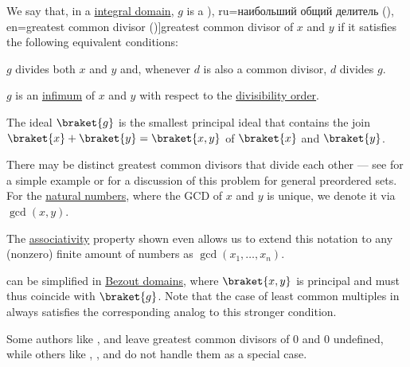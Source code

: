 \begin{definition}\label{def:gcd}
  We say that, in a \hyperref[def:integral_domain]{integral domain}, \( g \) is a \term[bg=най-голям общ делител (на два полинома) (\cite[173]{Обрешков1962ВисшаАлгебра}), ru=наибольший общий делитель (\cite[def. 3.5.3]{Винберг2014КурсАлгебры}), en=greatest common divisor (\cite[def. V.2.2]{Aluffi2009Algebra})]{greatest common divisor} of \( x \) and \( y \) if it satisfies the following equivalent conditions:

  \begin{thmenum}
     \( g \) divides both \( x \) and \( y \) and, whenever \( d \) is also a common divisor, \( d \) divides \( g \).

     \( g \) is an \hyperref[def:extremal_points/supremum_and_infimum]{infimum} of \( x \) and \( y \) with respect to the \hyperref[thm:semiring_divisibility_order]{divisibility order}.

     The ideal \( \braket{ g } \) is the smallest principal ideal that contains the join \( \braket{ x } + \braket{ y } = \braket{ x, y } \) of \( \braket{ x } \) and \( \braket{ y } \).
  \end{thmenum}
\end{definition}
\begin{comments}
  \item There may be distinct greatest common divisors that divide each other --- see  for a simple example or  for a discussion of this problem for general preordered sets. For the \hyperref[def:natural_numbers]{natural numbers}, where the GCD of \( x \) and \( y \) is unique, we denote it via \( \gcd(x, y) \).

  The \hyperref[def:binary_operation/associative]{associativity} property shown  even allows us to extend this notation to any (nonzero) finite amount of numbers as \( \gcd(x_1, \ldots, x_n) \).

  \item {} can be simplified in \hyperref[def:bezout_domain]{Bezout domains}, where \( \braket{ x, y } \) is principal and must thus coincide with \( \braket{ g } \). Note that the case of least common multiples in  always satisfies the corresponding analog to this stronger condition.

  \item Some authors like ,  and  leave greatest common divisors of \( 0 \) and \( 0 \) undefined, while others like , ,  and  do not handle them as a special case.
\end{comments}
